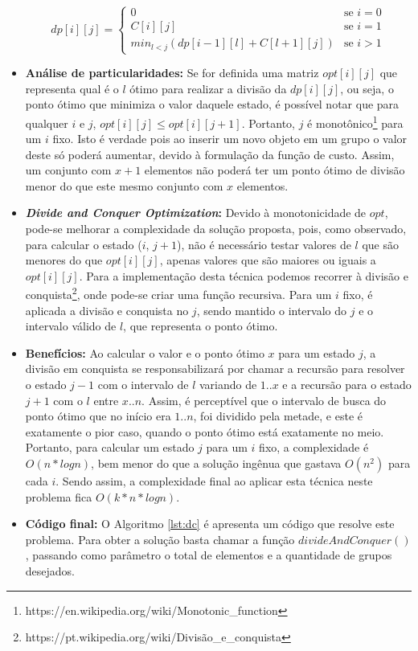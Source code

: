 \begin{itemize}[leftmargin=-.001in]
\begin{equation}
dp[i][j] =
\begin{cases}
0 &\text{se } i = 0 \\
C[i][j] &\text{se } i = 1 \\
min_{l < j}(dp[i-1][l] + C[l+1][j]) &\text{se } i > 1
\end{cases}
\label{eq:dc1}
\end{equation}

\item \textbf{Análise de particularidades:} 
Se for definida uma matriz $opt[i][j]$ que representa qual é o $l$ ótimo para realizar a divisão da $dp[i][j]$, ou seja, o ponto ótimo que minimiza o valor daquele estado, é possível notar que para qualquer $i$ e $j$, $opt[i][j] \leq opt[i][j+1]$. Portanto, $j$ é monotônico\footnote{https://en.wikipedia.org/wiki/Monotonic\_function} para um $i$ fixo. Isto é verdade pois ao inserir um novo objeto em um grupo o valor deste só poderá aumentar, devido à formulação da função de custo. Assim, um conjunto com $x+1$ elementos não poderá ter um ponto ótimo de divisão menor do que este mesmo conjunto com $x$ elementos.

\item \textbf{\textit{Divide and Conquer Optimization}:} Devido à monotonicidade de $opt$, pode-se melhorar a complexidade da solução proposta, pois, como observado, para calcular o estado ($i$, $j+1$), não é necessário testar valores de $l$ que são menores do que $opt[i][j]$, apenas valores que são maiores ou iguais a $opt[i][j]$. Para a implementação desta técnica podemos recorrer à divisão e conquista\footnote{https://pt.wikipedia.org/wiki/Divisão\_e\_conquista}, onde pode-se criar uma função recursiva. Para um $i$ fixo, é aplicada a divisão e conquista no $j$, sendo mantido o intervalo do $j$ e o intervalo válido de $l$, que representa o ponto ótimo.

\item \textbf{Benefícios:} Ao calcular o valor e o ponto ótimo $x$ para um estado $j$, a divisão em conquista se responsabilizará por chamar a recursão para resolver o estado $j-1$ com o intervalo de $l$ variando de $1..x$ e a recursão para o estado $j+1$ com o $l$ entre $x..n$. Assim, é perceptível que o intervalo de busca do ponto ótimo que no início era $1..n$, foi dividido pela metade, e este é exatamente o pior caso, quando o ponto ótimo está exatamente no meio. Portanto, para calcular um estado $j$ para um $i$ fixo, a complexidade é $O(n*logn)$, bem menor do que a solução ingênua que gastava $O(n^2)$ para cada $i$. Sendo assim, a complexidade final ao aplicar esta técnica neste problema fica $O(k*n*logn)$.
\item \textbf{Código final:} O Algoritmo \ref{lst:dc} é apresenta um código que resolve este problema. Para obter a solução basta chamar a função $divideAndConquer()$, passando como parâmetro o total de elementos e a quantidade de grupos desejados.
\\


\end{itemize}

